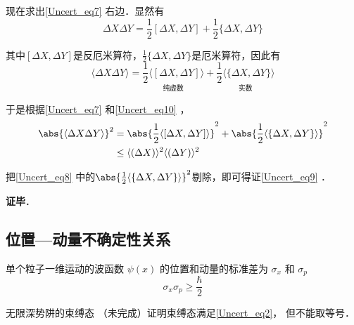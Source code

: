 现在求出\autoref{Uncert_eq7} 右边．显然有
\begin{equation}
\Delta X \Delta Y = \frac{1}{2}[\Delta X, \Delta Y]+\frac{1}{2}\{\Delta X, \Delta Y\}
\end{equation}

其中$[\Delta X, \Delta Y]$是反厄米算符，$\frac{1}{2}\{\Delta X, \Delta Y\}$是厄米算符，因此有
\begin{equation}\label{Uncert_eq10}
\langle\Delta X \Delta Y\rangle = \underset{\text{纯虚数}}{\frac{1}{2}\langle[\Delta X, \Delta Y]\rangle} + \underset{\text{实数}}{\frac{1}{2}\langle\{\Delta X, \Delta Y\}\rangle}
\end{equation}

于是根据\autoref{Uncert_eq7} 和\autoref{Uncert_eq10} ，
\begin{equation}\label{Uncert_eq8}
\begin{aligned}
\abs{\langle\Delta X \Delta Y\rangle}^2 &= \abs{\frac{1}{2}\langle[\Delta X, \Delta Y]\rangle}^2+\abs{\frac{1}{2}\langle\{\Delta X, \Delta Y\}\rangle}^2\\
&\leq\langle (\Delta X)\rangle^2\langle (\Delta Y)\rangle^2
\end{aligned}
\end{equation}

把\autoref{Uncert_eq8} 中的$\abs{\frac{1}{2}\langle\{\Delta X, \Delta Y\}\rangle}^2$剔除，即可得证\autoref{Uncert_eq9} ．

\textbf{证毕}．






\subsection{位置—动量不确定性关系}
单个粒子一维运动的波函数 $\psi(x)$ 的位置和动量的标准差为 $\sigma_x$ 和 $\sigma_p$
\begin{equation}\label{Uncert_eq2}
\sigma_x \sigma_p \geqslant \frac{\hbar}{2}
\end{equation}

\begin{example}{无限深势阱的束缚态}\label{Uncert_ex2}
（未完成）证明束缚态满足\autoref{Uncert_eq2}， 但不能取等号．
\end{example}

